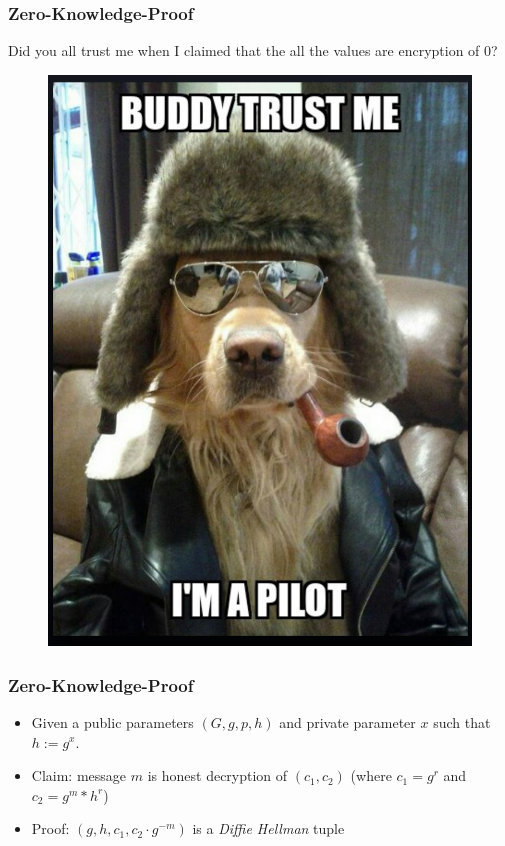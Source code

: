 \documentclass{beamer}
\begin{document}
\begin{frame}
\frametitle{Zero-Knowledge-Proof}
{Did you all trust me when I claimed that the all the values are encryption of 0?}
\begin{figure}
\includegraphics[scale=0.30]{pilot.png}
\end{figure}

\end{frame}


\begin{frame}
\frametitle{Zero-Knowledge-Proof}
\begin{itemize}
\item Given a public parameters $(G, g, p, h)$ and private parameter $x$ such that $h := g^x$.
\item Claim: message $m$  is honest decryption of $(c_{1}, c_{2})$ (where $c_{1} = g^r$ and $c_{2} = g^{m} * h^{r}$)
\item Proof: $(g, h, c_{1}, c_{2} \cdot g^{-m})$ is a \textit{Diffie Hellman} tuple 
\end{itemize}
\end{frame}
\end{document}
